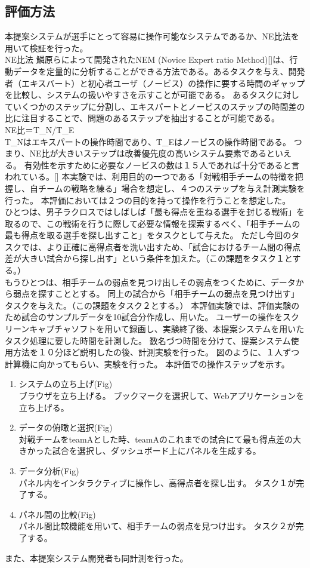 \documentclass[sotsuron]{kuee}
\begin{document}
		\subsection{評価方法}
			本提案システムが選手にとって容易に操作可能なシステムであるか、NE比法を用いて検証を行った。
			\\NE比法
			鱗原らによって開発されたNEM (Novice Expert ratio Method)[]は、行動データを定量的に分析することができる方法である。あるタスクを与え、開発者（エキスバート）と初心者ユーザ（ノービス）の操作に要する時間のギャップを比較し、システムの扱いやすさを示すことが可能である。
			あるタスクに対していくつかのステップに分割し、エキスパートとノービスのステップの時間差の比に注目することで、問題のあるステップを抽出することが可能である。
			\\NE比＝T\_N/T\_E
			\\ T\_Nはエキスパートの操作時間であり、T\_Eはノービスの操作時間である。
			つまり、NE比が大きいステップは改善優先度の高いシステム要素であるといえる。
			有効性を示すために必要なノービスの数は１５人であれば十分であると言われている。[]
			本実験では、利用目的の一つである「対戦相手チームの特徴を把握し、自チームの戦略を練る」場合を想定し、４つのステップを与え計測実験を行った。
			本評価においては２つの目的を持って操作を行うことを想定した。
			\\ひとつは、男子ラクロスではしばしば「最も得点を重ねる選手を封じる戦術」を取るので、この戦術を行うに際して必要な情報を探索するべく、「相手チームの最も得点を取る選手を探し出すこと」をタスクとして与えた。
			ただし今回のタスクでは、より正確に高得点者を洗い出すため、「試合におけるチーム間の得点差が大きい試合から探し出す」という条件を加えた。（この課題をタスク１とする。）
			\\もうひとつは、相手チームの弱点を見つけ出しその弱点をつくために、データから弱点を探すこととする。
			同上の試合から「相手チームの弱点を見つけ出す」タスクを与えた。（この課題をタスク２とする。）
			本評価実験では、評価実験のため試合のサンプルデータを10試合分作成し、用いた。
			ユーザーの操作をスクリーンキャプチャソフトを用いて録画し、実験終了後、本提案システムを用いたタスク処理に要した時間を計測した。
			数名づつ時間を分けて、提案システム使用方法を１０分ほど説明したの後、計測実験を行った。
			図のように、１人ずつ計算機に向かってもらい、実験を行った。
			本評価での操作ステップを示す。
			\begin{enumerate}
				\item システムの立ち上げ(Fig)
				\\ブラウザを立ち上げる。
				ブックマークを選択して、Webアプリケーションを立ち上げる。
				\item データの俯瞰と選択(Fig)
				\\対戦チームをteamAとした時、teamAのこれまでの試合にて最も得点差の大きかった試合を選択し、ダッシュボード上にパネルを生成する。
				\item データ分析(Fig)
				\\パネル内をインタラクティブに操作し、高得点者を探し出す。
				タスク１が完了する。
				\item パネル間の比較(Fig)
				\\パネル間比較機能を用いて、相手チームの弱点を見つけ出す。
				タスク２が完了する。
			\end{enumerate}
			また、本提案システム開発者も同計測を行った。
\end{document}
